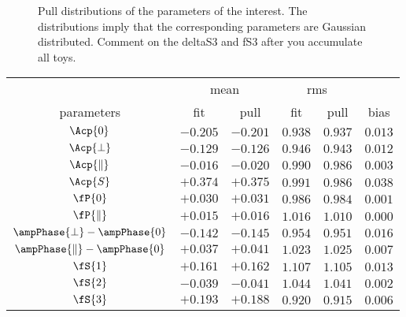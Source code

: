 \begin{figure}[!h]
\begin{subfigure}{0.5\textwidth}
    \scalebox{0.60}{}
    \caption{}
    \label{pull_ASMag2_bin4}
  \end{subfigure}%
  \hfill%
  \begin{subfigure}{0.5\textwidth}
    \scalebox{0.60}{}
    \caption{}
    \label{pull_ASPhase_bin4}
  \end{subfigure}
\caption{Pull distributions of the parameters of the \swave interest. The distributions imply that the corresponding parameters are Gaussian distributed.
  {\color{red} Comment on the deltaS3 and fS3 after you accumulate all toys.}}
\label{pull_swave}
\end{figure}

\begin{table}
  \centering
  \begin{tabular}{c c c c c | c}
    \cline{2-5}
               & \multicolumn{2}{c}{mean} & \multicolumn{2}{c}{rms} &  \\
    \cline{2-6}
    parameters & fit & pull & fit & pull & bias \\
    \cline{1-6}
    $                  \Acp{0}$ & $-0.205$ & $-0.201$ & $0.938$ & $0.937$  & $0.013$ \\
    $              \Acp{\perp}$ & $-0.129$ & $-0.126$ & $0.946$ & $0.943$  & $0.012$ \\
    $          \Acp{\parallel}$ & $-0.016$ & $-0.020$ & $0.990$ & $0.986$  & $0.003$ \\
    $                  \Acp{S}$ & $+0.374$ & $+0.375$ & $0.991$ & $0.986$  & $0.038$ \\
    \hline
    $                   \fP{0}$ & $+0.030$ & $+0.031$ & $0.986$ & $0.984$  & $0.001$ \\
    $           \fP{\parallel}$ & $+0.015$ & $+0.016$ & $1.016$ & $1.010$  & $0.000$ \\
    $         \ampPhase{\perp}-\ampPhase{0}$ & $-0.142$ & $-0.145$ & $0.954$ & $0.951$  & $0.016$ \\
    $     \ampPhase{\parallel}-\ampPhase{0}$ & $+0.037$ & $+0.041$ & $1.023$ & $1.025$  & $0.007$ \\
    \hline
    $                   \fS{1}$ & $+0.161$ & $+0.162$ & $1.107$ & $1.105$  & $0.013$ \\
    $                   \fS{2}$ & $-0.039$ & $-0.041$ & $1.044$ & $1.041$  & $0.002$ \\
    $                   \fS{3}$ & $+0.193$ & $+0.188$ & $0.920$ & $0.915$  & $0.006$ \\

\end{tabular}
\end{table}
